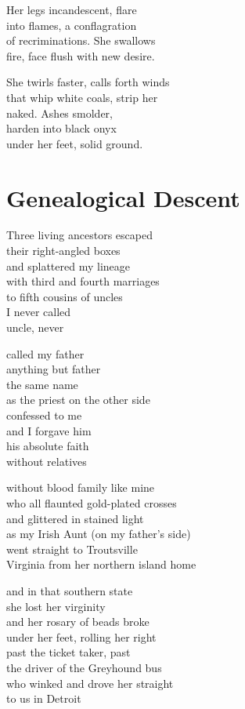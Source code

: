 \documentclass[twoside,10pt]{book}
\begin{document}
Her legs incandescent, flare\\
into flames, a conflagration\\
of recriminations. She swallows\\
fire, face flush with new desire.

She twirls faster, calls forth winds\\
that whip white coals, strip her\\
naked. Ashes smolder,\\
harden into black onyx\\
under her feet, solid ground.


\clearpage
\section{Genealogical Descent}

Three living ancestors escaped\\
their right-angled boxes\\
and splattered my lineage\\
with third and fourth marriages\\
to fifth cousins of uncles\\
I never called\\
uncle, never

called my father\\
anything but father\\
the same name\\
as the priest on the other side\\
confessed to me\\
and I forgave him\\
his absolute faith\\
without relatives

without blood family like mine\\
who all flaunted gold-plated crosses\\
and glittered in stained light\\
as my Irish Aunt (on my father's side)\\
went straight to Troutsville\\
Virginia from her northern island home

and in that southern state\\
she lost her virginity\\
and her rosary of beads broke\\
under her feet, rolling her right\\
past the ticket taker, past\\
the driver of the Greyhound bus\\
who winked and drove her straight\\
to us in Detroit
\end{document}
